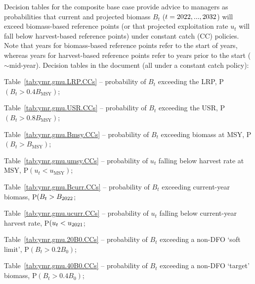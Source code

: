 \documentclass[11pt]{book}
\newcommand{\Bmsy}{B_\mathrm{MSY}}
\newcommand{\umsy}{u_\mathrm{MSY}}
\begin{document}
Decision tables for the composite base case provide advice to managers as probabilities that current and projected biomass $B_t$ ($t = 2022, ..., 2032$) will exceed biomass-based reference points (or that projected exploitation rate $u_t$ will fall below harvest-based reference points) under constant catch (CC) policies. Note that years for biomass-based reference points refer to the start of years, whereas years for harvest-based reference points refer to years prior to the start ($\sim$mid-year).
Decision tables in the document (all under a constant catch policy):
\vspace{-0.5\baselineskip}%
\begin{itemize_csas}
\item Table~\ref{tab:ymr.gmu.LRP.CCs} -- probability of $B_t$ exceeding the LRP, P$(B_t > 0.4 \Bmsy)$; %
\item Table~\ref{tab:ymr.gmu.USR.CCs} -- probability of $B_t$ exceeding the USR, P$(B_t > 0.8 \Bmsy)$; %
\item Table~\ref{tab:ymr.gmu.Bmsy.CCs} -- probability of $B_t$ exceeding biomass at MSY, P$(B_t > \Bmsy)$; %
\item Table~\ref{tab:ymr.gmu.umsy.CCs} -- probability of $u_t$ falling below harvest rate at MSY, P$(u_t < \umsy)$; %
\item Table~\ref{tab:ymr.gmu.Bcurr.CCs} -- probability of $B_t$ exceeding current-year biomass, P$(B_t > B_{2022}$; %
\item Table~\ref{tab:ymr.gmu.ucurr.CCs} -- probability of $u_t$ falling below current-year harvest rate, P$(u_t < u_{2021}$; %
\item Table~\ref{tab:ymr.gmu.20B0.CCs} -- probability of $B_t$ exceeding a non-DFO `soft limit', P$(B_t > 0.2 B_0)$; %
\item Table~\ref{tab:ymr.gmu.40B0.CCs} -- probability of $B_t$ exceeding a non-DFO `target' biomass, P$(B_t > 0.4 B_0)$; %
\end{itemize_csas}
\end{document}
